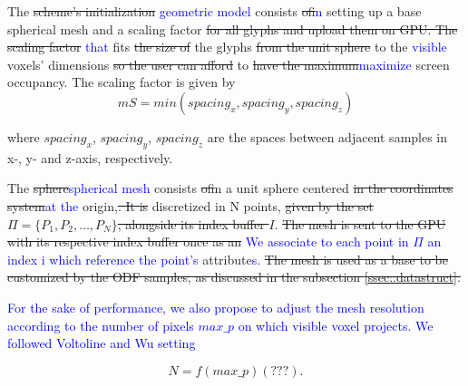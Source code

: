\documentclass[twoside,twocolumn,10pt]{article}
\begin{document}

The \sout{scheme's initialization} \textcolor{blue}{geometric model} consists \sout{of}\textcolor{blue}{in} setting up a base spherical mesh and a scaling factor \sout{for all glyphs and upload them on GPU.
The scaling factor} \textcolor{blue}{that} fits \sout{the size of} the glyphs \sout{from the unit sphere} to the \textcolor{blue}{visible} voxels' dimensions\sout{ so the user can afford} to \sout{have the maximum}\textcolor{blue}{maximize} screen occupancy. The scaling factor is given by 
\begin{equation}
\label{eq:spacings}
mS = min(spacing_x, spacing_y, spacing_z)
\end{equation}

where $spacing_x$, $spacing_y$, $spacing_z$ are the spaces between adjacent samples in x-, y- and z-axis, respectively.


The \sout{sphere}\textcolor{blue}{spherical mesh} consists \sout{of}{in} a unit sphere centered \sout{in the coordinates system}\textcolor{blue}{at the} origin,\sout{. It is} discretized in N points, \sout{given by the set} $\Pi = \{P_1, P_2, \dots, P_N\}$\sout{, alongside its index buffer $I$}. \sout{The mesh is sent to the GPU with its respective index buffer once as an} \textcolor{blue}{We associate to each point in $\Pi$ an index i which reference the point's} attribute\textcolor{blue}{s}. \sout{The mesh is used as a base to be customized by the ODF samples, as discussed in the subsection \ref{ssec::datastruct}.} 

\textcolor{blue}{For the sake of performance, we also propose to adjust the mesh resolution according to the number of pixels $max\_p$ on which visible voxel projects. We followed Voltoline and Wu setting}

\begin{equation}
\label{eq:N}
N = f(max\_p) (???).
\end{equation}


\end{document}
